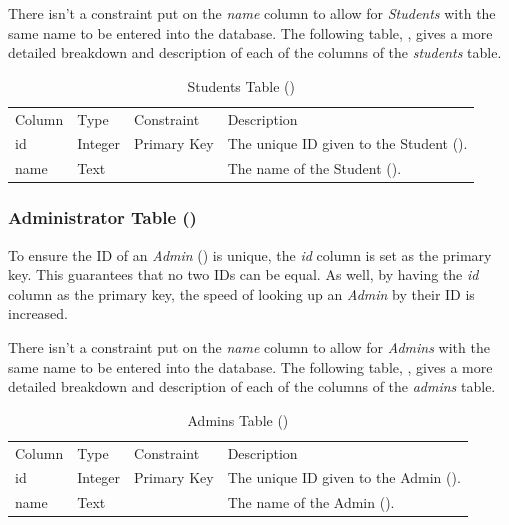 \documentclass[12pt,letterpaper]{article}
\begin{document}
There isn't a constraint put on the \textit{name} column to allow for \textit{Students} with the same name to be entered into the database. The following table, , gives a more detailed breakdown and description of each of the columns of the \textit{students} table.

\begin{table}[H]
	\caption{Students Table ()} 
	\begin{tabu} to \textwidth {l l l X}
		\tableheader{}Column & Type & Constraint & Description \\
		id   & Integer & Primary Key & The unique ID given to the Student (). \\
		name & Text    &             & The name of the Student (). \\
	\end{tabu}
\end{table}

\subsubsection*{Administrator Table ()}
To ensure the ID of an \textit{Admin} () is unique, the \textit{id} column is set as the primary key. This guarantees that no two IDs can be equal. As well, by having the \textit{id} column as the primary key, the speed of looking up an \textit{Admin} by their ID is increased.

There isn't a constraint put on the \textit{name} column to allow for \textit{Admins} with the same name to be entered into the database. The following table, , gives a more detailed breakdown and description of each of the columns of the \textit{admins} table.

\begin{table}[H]
	\caption{Admins Table ()} 
	\begin{tabu} to \textwidth {l l l X}
		\tableheader{}Column & Type & Constraint & Description \\
		id   & Integer & Primary Key & The unique ID given to the Admin (). \\
		name & Text    &             & The name of the Admin (). \\
	\end{tabu}
\end{table}
\end{document}
